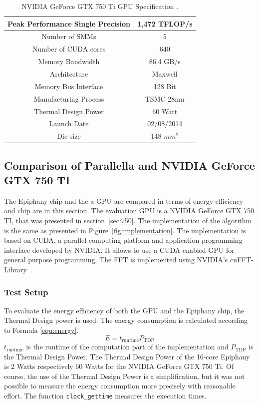 \documentclass[american, hauptseminar, twoside]{zihpub}
\begin{document}
			\begin{table}[H]
				\centering
				\renewcommand{\arraystretch}{1.2}
				\begin{tabular}{|c|c|}
					\hline Peak Performance Single Precision & 1,472 TFLOP/s \\ 
					\hline Number of SMMs & 5 \\ 
					\hline Number of CUDA cores & 640 \\ 
					\hline Memory Bandwidth  & 86.4 GB/s  \\ 
					\hline Architecture  & Maxwell \\ 
					\hline Memory Bus Interface & 128 Bit \\ 
					\hline Manufacturing Process & TSMC 28nm \\ 
					\hline Thermal Design Power & 60 Watt \\ 
					\hline Launch Date & 02/08/2014 \\ 
					\hline Die size & 148 $mm^2$ \\ 
					\hline 
				\end{tabular}
				\caption{NVIDIA GeForce GTX 750 Ti GPU Specification \cite{Smith2014}.} 
				\label{tab:speci}
			\end{table}
			
			\subsection{Comparison of Parallella and NVIDIA GeForce GTX 750 TI}
				The Epiphany chip and the a GPU are compared in terms of energy efficiency and chip are in this section. The evaluation GPU is a NVIDIA GeForce GTX 750 TI, that was presented in section~\ref{sec:750}. The implementation of the algorithm is the same as presented in Figure~\ref{fig:implementation}. The implementation is based on CUDA, a parallel computing platform and application programming interface developed by NVIDIA. It allows to use a CUDA-enabled GPU for general purpose programming. The FFT is implemented using NVIDIA's cuFFT-Library~\cite{NVIDIA2015}. 
				\subsubsection*{Test Setup}  
				To evaluate the energy efficiency of both the GPU and the Epiphany chip, the Thermal Design power is used. The energy consumption is calculated according to Formula \ref{equ:energy}.
				\begin{equation}
					E = t_\mathrm{runtime} P_\mathrm{TDP}
					\label{equ:energy}
				\end{equation}
				$t_\mathrm{runtime}$ is the runtime of the computation part of the implementation and $P_\mathrm{TDP}$ is the Thermal Design Power. The Thermal Design Power of the 16-core Epiphany is 2 Watts respectively 60 Watts for the NVIDIA GeForce GTX 750 Ti. Of course, the use of the Thermal Design Power is a simplification, but it was not possible to measure the energy consumption more precisely with reasonable effort. The function \texttt{clock_gettime} measures the execution times.
\end{document}
